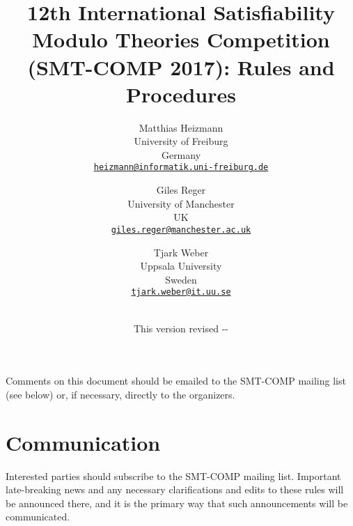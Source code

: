 \documentclass[12pt]{article}
\begin{document}
\date{\small This version revised \the\year-\the\month-\the\day}

\title{12th International Satisfiability Modulo Theories Competition
  (SMT-COMP 2017): Rules and Procedures}

\def\doauthor#1{{%
  \hsize.5\hsize \advance\hsize by-1cm %
  \def\\{\hss\egroup\hbox to\hsize\bgroup\strut\hss}%
  \vbox{\hbox to\hsize\bgroup\strut\hss#1\hss\egroup}}}%

\def\header#1{\medskip\noindent\textbf{#1}}

\author{%
Matthias Heizmann \\
University of Freiburg \\
Germany \\
{\small\href{mailto:heizmann@informatik.uni-freiburg.de}{\texttt{heizmann@informatik.uni-freiburg.de}}} \\
\and
Giles Reger \\
University of Manchester \\
UK \\
{\small\href{mailto:giles.reger@manchester.ac.uk}{\texttt{giles.reger@manchester.ac.uk}}} \\
\and
Tjark Weber \\
Uppsala University \\
Sweden \\
{\small\href{mailto:tjark.weber@it.uu.se}{\texttt{tjark.weber@it.uu.se}}} \\
\\
}

\maketitle

\noindent Comments on this document should be emailed to the SMT-COMP
mailing list (see below) or, if necessary, directly to the organizers.


\section{Communication}

Interested parties should subscribe to the SMT-COMP mailing list.
Important late-breaking news and any necessary clarifications and
edits to these rules will be announced there, and it is the primary
way that such announcements will be communicated.
\end{document}
